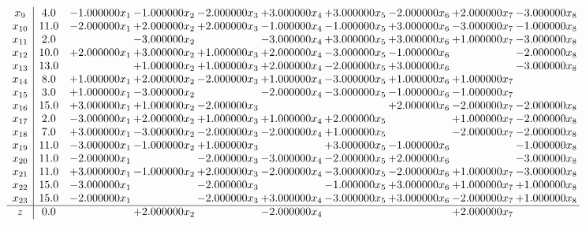\documentclass[10pt]{article}
\begin{document}
\[\begin{array}{c| c c@{\hskip 2pt} c@{\hskip 2pt} c@{\hskip 2pt} c@{\hskip 2pt} c@{\hskip 2pt} c@{\hskip 2pt} c@{\hskip 2pt} c@{\hskip 2pt} }
 x_{9}   &  4.0 & -1.000000 x_{1} & -1.000000 x_{2} & -2.000000 x_{3} & + 3.000000 x_{4} & + 3.000000 x_{5} & -2.000000 x_{6} & + 2.000000 x_{7} & -3.000000 x_{8}\\
 x_{10}   &  11.0 & -2.000000 x_{1} & + 2.000000 x_{2} & + 2.000000 x_{3} & -1.000000 x_{4} & -1.000000 x_{5} & + 3.000000 x_{6} & -3.000000 x_{7} & -1.000000 x_{8}\\
 x_{11}   &  2.0  &   & -3.000000 x_{2} &   & -3.000000 x_{4} & + 3.000000 x_{5} & + 3.000000 x_{6} & + 1.000000 x_{7} & -3.000000 x_{8}\\
 x_{12}   &  10.0 & + 2.000000 x_{1} & + 3.000000 x_{2} & + 1.000000 x_{3} & + 2.000000 x_{4} & -3.000000 x_{5} & -1.000000 x_{6} &   & -2.000000 x_{8}\\
 x_{13}   &  13.0  &   & + 1.000000 x_{2} & + 1.000000 x_{3} & + 2.000000 x_{4} & -2.000000 x_{5} & + 3.000000 x_{6} &   & -3.000000 x_{8}\\
 x_{14}   &  8.0 & + 1.000000 x_{1} & + 2.000000 x_{2} & -2.000000 x_{3} & + 1.000000 x_{4} & -3.000000 x_{5} & + 1.000000 x_{6} & + 1.000000 x_{7} &   \\
 x_{15}   &  3.0 & + 1.000000 x_{1} & -3.000000 x_{2} &   & -2.000000 x_{4} & -3.000000 x_{5} & -1.000000 x_{6} & -1.000000 x_{7} &   \\
 x_{16}   &  15.0 & + 3.000000 x_{1} & + 1.000000 x_{2} & -2.000000 x_{3} &    &   & + 2.000000 x_{6} & -2.000000 x_{7} & -2.000000 x_{8}\\
 x_{17}   &  2.0 & -3.000000 x_{1} & + 2.000000 x_{2} & + 1.000000 x_{3} & + 1.000000 x_{4} & + 2.000000 x_{5} &   & + 1.000000 x_{7} & -2.000000 x_{8}\\
 x_{18}   &  7.0 & + 3.000000 x_{1} & -3.000000 x_{2} & -2.000000 x_{3} & -2.000000 x_{4} & + 1.000000 x_{5} &   & -2.000000 x_{7} & -2.000000 x_{8}\\
 x_{19}   &  11.0 & -3.000000 x_{1} & -1.000000 x_{2} & + 1.000000 x_{3} &   & + 3.000000 x_{5} & -1.000000 x_{6} &   & -1.000000 x_{8}\\
 x_{20}   &  11.0 & -2.000000 x_{1} &   & -2.000000 x_{3} & -3.000000 x_{4} & -2.000000 x_{5} & + 2.000000 x_{6} &   & -3.000000 x_{8}\\
 x_{21}   &  11.0 & + 3.000000 x_{1} & -1.000000 x_{2} & + 2.000000 x_{3} & -2.000000 x_{4} & -3.000000 x_{5} & -2.000000 x_{6} & + 1.000000 x_{7} & -3.000000 x_{8}\\
 x_{22}   &  15.0 & -3.000000 x_{1} &   & -2.000000 x_{3} &   & -1.000000 x_{5} & + 3.000000 x_{6} & + 1.000000 x_{7} & + 1.000000 x_{8}\\
 x_{23}   &  15.0 & -2.000000 x_{1} &   & -2.000000 x_{3} & + 3.000000 x_{4} & -3.000000 x_{5} & + 3.000000 x_{6} & -2.000000 x_{7} & + 1.000000 x_{8}\\
\hline
z    &  0.0  &   & + 2.000000 x_{2} &   & -2.000000 x_{4} &    &   & + 2.000000 x_{7} &   \\
\end{array}\]
\end{document}
